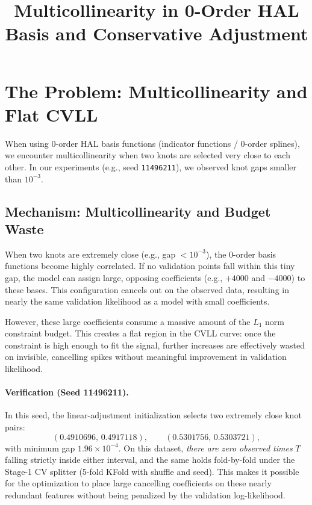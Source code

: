 \documentclass[11pt]{article}
\title{Multicollinearity in 0-Order HAL Basis and Conservative Adjustment}
\author{}
\date{}
\begin{document}
\maketitle

\section{The Problem: Multicollinearity and Flat CVLL}

When using 0-order HAL basis functions (indicator functions / 0-order splines), we encounter multicollinearity when two knots are selected very close to each other. In our experiments (e.g., seed \texttt{11496211}), we observed knot gaps smaller than $10^{-3}$.

\subsection{Mechanism: Multicollinearity and Budget Waste}
When two knots are extremely close (e.g., gap $< 10^{-3}$), the 0-order basis functions become highly correlated. If no validation points fall within this tiny gap, the model can assign large, opposing coefficients (e.g., $+4000$ and $-4000$) to these bases. This configuration cancels out on the observed data, resulting in nearly the same validation likelihood as a model with small coefficients.

However, these large coefficients consume a massive amount of the $L_1$ norm constraint budget. This creates a flat region in the CVLL curve: once the constraint is high enough to fit the signal, further increases are effectively wasted on invisible, cancelling spikes without meaningful improvement in validation likelihood.

\paragraph{Verification (Seed 11496211).}
In this seed, the linear-adjustment initialization selects two extremely close knot pairs:
\[
(0.4910696,\,0.4917118), \qquad (0.5301756,\,0.5303721),
\]
with minimum gap $1.96\times 10^{-4}$. On this dataset, \emph{there are zero observed times} $T$ falling strictly inside either interval, and the same holds fold-by-fold under the Stage-1 CV splitter (5-fold KFold with shuffle and seed).
This makes it possible for the optimization to place large cancelling coefficients on these nearly redundant features without being penalized by the validation log-likelihood.
\end{document}
